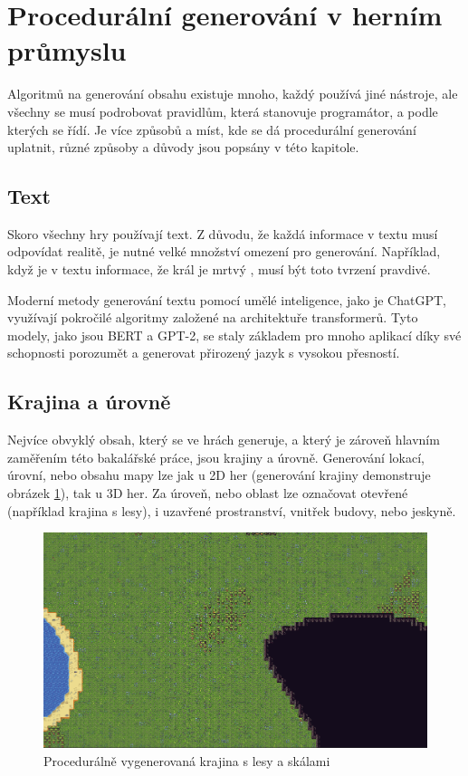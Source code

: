 \section{Procedurální generování v herním průmyslu}
\label{proceduralInGames}
Algoritmů na generování obsahu existuje mnoho, každý používá jiné nástroje, ale všechny se musí podrobovat pravidlům, která stanovuje programátor, a podle kterých se řídí. Je více způsobů a míst, kde se dá procedurální generování uplatnit, různé způsoby a důvody jsou popsány v této kapitole.

\subsection{Text}
Skoro všechny hry používají text. Z důvodu, že každá informace v textu musí odpovídat realitě, je nutné velké množství omezení pro generování. Například, když je v textu informace, že král je mrtvý \cite{liuDeep}, musí být toto tvrzení pravdivé.

Moderní metody generování textu pomocí umělé inteligence, jako je ChatGPT, využívají pokročilé algoritmy založené na architektuře transformerů. Tyto modely, jako jsou BERT a GPT-2, se staly základem pro mnoho aplikací díky své schopnosti porozumět a generovat přirozený jazyk s vysokou přesností.~\cite{montesinos2020}

\subsection{Krajina a úrovně}
Nejvíce obvyklý obsah, který se ve hrách generuje, a který je zároveň hlavním zaměřením této bakalářské práce, jsou krajiny a úrovně. Generování lokací, úrovní, nebo obsahu mapy lze jak u 2D her (generování krajiny demonstruje obrázek \ref{proceduralWorld}), tak u 3D her. Za úroveň, nebo oblast lze označovat otevřené (například krajina s lesy), i uzavřené prostranství, vnitřek budovy, nebo jeskyně.

\begin{figure}[h]
	\centering
	\includegraphics[scale=0.6]{obrazky-figures/ProceduralWorld.png}
	\caption{Procedurálně vygenerovaná krajina s lesy a skálami}
	\label{proceduralWorld}
\end{figure}

